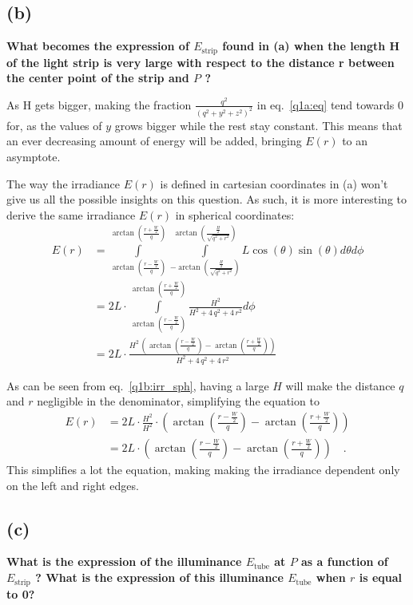 \documentclass{report}
\begin{document}
\subsection{(b)}
\textbf{ What becomes the expression of $E_{\text{strip}}$ found in (a) when the length H of the light strip is very large with respect to the distance r between the center point of the strip and $P$ ?}

As H gets bigger, making the fraction $\frac{q^2}{\left(q^2 + y^2 + z^2\right)^2}$ in eq.~\eqref{q1a:eq} tend towards $0$ for, as the values of $y$ grows bigger while the rest stay constant. This means that an ever decreasing amount of energy will be added, bringing $E(r)$ to an asymptote.

The way the irradiance $E(r)$ is defined in cartesian coordinates in (a) won't give us all the possible insights on this question. As such, it is more interesting to derive the same irradiance $E(r)$ in spherical coordinates:
\begin{align}
E(r) &= \int\limits_{\arctan \left(\frac{r-\frac{W}{2}}{q} \right)}^{\arctan \left(\frac{r+\frac{W}{2}}{q} \right)} \int\limits_{-\arctan(\frac{\frac{H}{2}}{\sqrt{q^2+r^2}})}^{\arctan(\frac{\frac{H}{2}}{\sqrt{q^2+r^2}})} L \cos(\theta) \sin(\theta) d\theta d\phi \\
     &= 2 L \cdot \int\limits_{\arctan \left(\frac{r-\frac{W}{2}}{q} \right)}^{\arctan \left(\frac{r+\frac{W}{2}}{q} \right)} \frac{H^2}{H^2 + 4\, q^2 + 4\, r^2} d\phi \\
     &= 2 L \cdot \frac{H^2\, \left(\arctan\!\left(\frac{r - \frac{W}{2}}{q}\right) - \arctan\!\left(\frac{r + \frac{W}{2}}{q}\right)\right)}{H^2 + 4\, q^2 + 4\, r^2}
     \label{q1b:irr_sph}
\end{align}

As can be seen from eq.~\eqref{q1b:irr_sph}, having a large $H$ will make the distance $q$ and $r$ negligible in the denominator, simplifying the equation to
\begin{align}
E(r) &= 2 L \cdot \frac{H^2}{H^2} \cdot \left(\arctan\!\left(\frac{r - \frac{W}{2}}{q}\right) - \arctan\!\left(\frac{r + \frac{W}{2}}{q}\right)\right) \\
     &= 2 L \cdot \left(\arctan\!\left(\frac{r - \frac{W}{2}}{q}\right) - \arctan\!\left(\frac{r + \frac{W}{2}}{q}\right)\right)
\quad.
\end{align}
This simplifies a lot the equation, making making the irradiance dependent only on the left and right edges.

\subsection{(c)}
\textbf{What is the expression of the illuminance $E_{\text{tube}}$ at $P$ as a function of $E_{\text{strip}}$ ?
What is the expression of this illuminance $E_{\text{tube}}$ when $r$ is equal to 0?}
\end{document}
